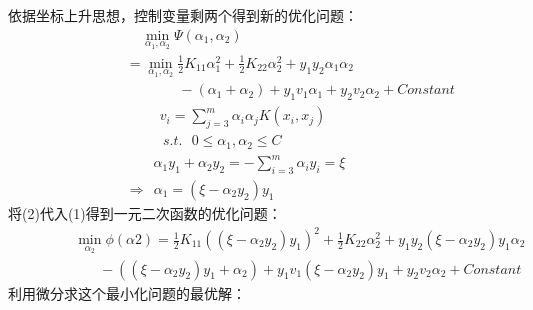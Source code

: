 \indent 依据坐标上升思想，控制变量剩两个得到新的优化问题：~~
\begin{align}
    &~~~~~~~~~~~~~~~~~~~~~\min \limits_{\alpha_1,\alpha_2} \Psi (\alpha_1,\alpha_2) \nonumber \\
    &~~~~~~~~~~~~~~~~=\min \limits_{\alpha_1,\alpha_2}\frac{1}{2}K_{11}\alpha_1^2+\frac{1}{2}K_{22}\alpha_2^2+y_1y_2\alpha_1\alpha_2 \nonumber \\
    &~~~~~~~~~~~~~~~~~~~~~~~~~~~~~~~~~-(\alpha_1+\alpha_2)+y_1v_1\alpha_1+y_2v_2\alpha_2+Constant   \tag{1}  \\
    &~~~~~~~~~~~~~~~~~~~~~~~~~~~ v_i = \sum_{j=3}^{m} \alpha_i\alpha_jK(x_i,x_j) \nonumber \\
    &~~~~~~~~~~~~~~~~~~~~~~~~~~~~s.t.~~~0\leq\alpha_1,\alpha_2 \leq C \nonumber \\
    &~~~~~~~~~~~~~~~~~~~~~~~~~\alpha_1y_1+\alpha_2y_2 = -\sum_{i=3}^{m}\alpha_iy_i =\xi \nonumber \\
    &~~~~~~~~~~~~~~~~\Rightarrow~~\alpha_1=(\xi-\alpha_2y_2)y_1   \tag{2}
\end{align}
\indent 将(2)代入(1)得到一元二次函数的优化问题：
\begin{align}
    &~~~~~~~~~~~~~~~~\min \limits_{\alpha_2}\phi(\alpha2)=\frac{1}{2}K_{11}((\xi-\alpha_2y_2)y_1)^2+\frac{1}{2}K_{22}\alpha_2^2+y_1y_2(\xi-\alpha_2y_2)y_1\alpha_2 \nonumber \\
    &~~~~~~~~~~~~~~~~~~~~~~~~-((\xi-\alpha_2y_2)y_1+\alpha_2)+y_1v_1(\xi-\alpha_2y_2)y_1+y_2v_2\alpha_2+Constant
\end{align}
\indent 利用微分求这个最小化问题的最优解：
